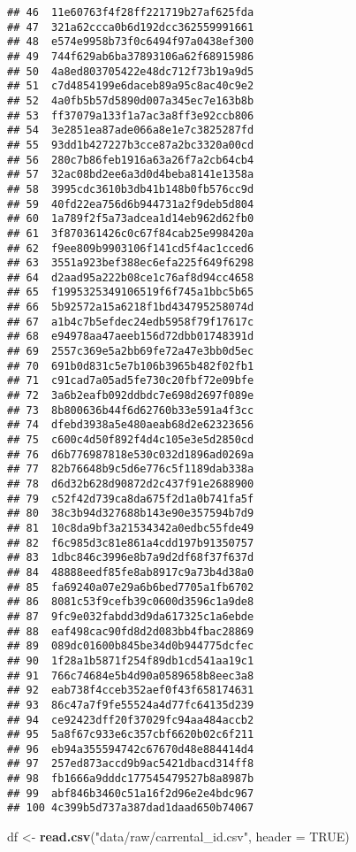 \documentclass[
]{article}
\newenvironment{Shaded}{\begin{snugshade}}{\end{snugshade}}
\newcommand{\AttributeTok}[1]{\textcolor[rgb]{0.13,0.29,0.53}{#1}}
\newcommand{\ConstantTok}[1]{\textcolor[rgb]{0.56,0.35,0.01}{#1}}
\newcommand{\FunctionTok}[1]{\textcolor[rgb]{0.13,0.29,0.53}{\textbf{#1}}}
\newcommand{\NormalTok}[1]{#1}
\newcommand{\OtherTok}[1]{\textcolor[rgb]{0.56,0.35,0.01}{#1}}
\newcommand{\StringTok}[1]{\textcolor[rgb]{0.31,0.60,0.02}{#1}}
\begin{document}
\begin{verbatim}
## 46  11e60763f4f28ff221719b27af625fda
## 47  321a62ccca0b6d192dcc362559991661
## 48  e574e9958b73f0c6494f97a0438ef300
## 49  744f629ab6ba37893106a62f68915986
## 50  4a8ed803705422e48dc712f73b19a9d5
## 51  c7d4854199e6daceb89a95c8ac40c9e2
## 52  4a0fb5b57d5890d007a345ec7e163b8b
## 53  ff37079a133f1a7ac3a8ff3e92ccb806
## 54  3e2851ea87ade066a8e1e7c3825287fd
## 55  93dd1b427227b3cce87a2bc3320a00cd
## 56  280c7b86feb1916a63a26f7a2cb64cb4
## 57  32ac08bd2ee6a3d0d4beba8141e1358a
## 58  3995cdc3610b3db41b148b0fb576cc9d
## 59  40fd22ea756d6b944731a2f9deb5d804
## 60  1a789f2f5a73adcea1d14eb962d62fb0
## 61  3f870361426c0c67f84cab25e998420a
## 62  f9ee809b9903106f141cd5f4ac1cced6
## 63  3551a923bef388ec6efa225f649f6298
## 64  d2aad95a222b08ce1c76af8d94cc4658
## 65  f1995325349106519f6f745a1bbc5b65
## 66  5b92572a15a6218f1bd434795258074d
## 67  a1b4c7b5efdec24edb5958f79f17617c
## 68  e94978aa47aeeb156d72dbb01748391d
## 69  2557c369e5a2bb69fe72a47e3bb0d5ec
## 70  691b0d831c5e7b106b3965b482f02fb1
## 71  c91cad7a05ad5fe730c20fbf72e09bfe
## 72  3a6b2eafb092ddbdc7e698d2697f089e
## 73  8b800636b44f6d62760b33e591a4f3cc
## 74  dfebd3938a5e480aeab68d2e62323656
## 75  c600c4d50f892f4d4c105e3e5d2850cd
## 76  d6b776987818e530c032d1896ad0269a
## 77  82b76648b9c5d6e776c5f1189dab338a
## 78  d6d32b628d90872d2c437f91e2688900
## 79  c52f42d739ca8da675f2d1a0b741fa5f
## 80  38c3b94d327688b143e90e357594b7d9
## 81  10c8da9bf3a21534342a0edbc55fde49
## 82  f6c985d3c81e861a4cdd197b91350757
## 83  1dbc846c3996e8b7a9d2df68f37f637d
## 84  48888eedf85fe8ab8917c9a73b4d38a0
## 85  fa69240a07e29a6b6bed7705a1fb6702
## 86  8081c53f9cefb39c0600d3596c1a9de8
## 87  9fc9e032fabdd3d9da617325c1a6ebde
## 88  eaf498cac90fd8d2d083bb4fbac28869
## 89  089dc01600b845be34d0b944775dcfec
## 90  1f28a1b5871f254f89db1cd541aa19c1
## 91  766c74684e5b4d90a0589658b8eec3a8
## 92  eab738f4cceb352aef0f43f658174631
## 93  86c47a7f9fe55524a4d77fc64135d239
## 94  ce92423dff20f37029fc94aa484accb2
## 95  5a8f67c933e6c357cbf6620b02c6f211
## 96  eb94a355594742c67670d48e884414d4
## 97  257ed873accd9b9ac5421dbacd314ff8
## 98  fb1666a9dddc177545479527b8a8987b
## 99  abf846b3460c51a16f2d96e2e4bdc967
## 100 4c399b5d737a387dad1daad650b74067
\end{verbatim}

\begin{Shaded}
\begin{Highlighting}[]
\NormalTok{df }\OtherTok{\textless{}{-}} \FunctionTok{read.csv}\NormalTok{(}\StringTok{"data/raw/carrental\_id.csv"}\NormalTok{, }\AttributeTok{header =} \ConstantTok{TRUE}\NormalTok{)}
\end{Highlighting}
\end{Shaded}
\end{document}
